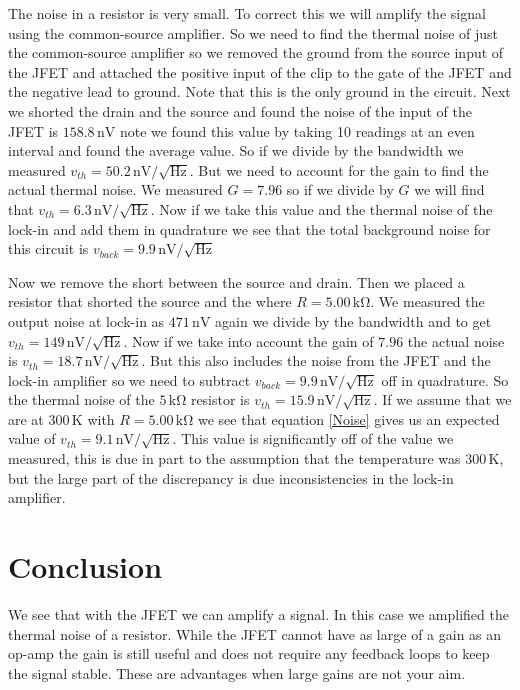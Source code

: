 \documentclass[11pt]{article}
\numberwithin{equation}{section}
\numberwithin{figure}{section}
\numberwithin{table}{section}
\newcommand{\unit}[1]{\ensuremath{\, \mathrm{#1}}}
\begin{document}
The noise in a resistor is very small. To correct this we will amplify the signal using the common-source amplifier. So we need to find the thermal noise of just the common-source amplifier so we removed the ground from the source input of the JFET and attached the positive input of the clip to the gate of the JFET and the negative lead to ground. Note that this is the only ground in the circuit. Next we shorted the drain and the source and found the noise of the input of the JFET is $158.8\unit{nV}$ note we found this value by taking 10 readings at an even interval and found the average value. So if we divide by the bandwidth we measured $v_{th} = 50.2\unit{nV/\sqrt{Hz}}$. 
But we need to account for the gain to find the actual thermal noise. We measured $G=7.96$ so if we divide by $G$ we will find that $v_{th} = 6.3\unit{nV/\sqrt{Hz}}$. Now if we take this value and the thermal noise of the lock-in and add them in quadrature we see that the total background noise for this circuit is $v_{back} = 9.9\unit{nV/\sqrt{Hz}}$

Now we remove the short between the source and drain. Then we placed a resistor that shorted the source and the where $R=5.00\unit{k\Omega}$. We measured the output noise at lock-in as $471\unit{nV}$ again we divide by the bandwidth and to get $v_{th} = 149\unit{nV/\sqrt{Hz}}$. Now if we take into account the gain of $7.96$ the actual noise is $v_{th} = 18.7\unit{nV/\sqrt{Hz}}$. But this also includes the noise from the JFET and the lock-in amplifier so we need to subtract $v_{back}=9.9\unit{nV/\sqrt{Hz}}$ off in quadrature. So the thermal noise of the $5\unit{k\Omega}$ resistor is $v_{th}=15.9\unit{nV/\sqrt{Hz}}$. If we assume that we are at $300\unit{K}$ with $R=5.00\unit{k\Omega}$ we see that equation \ref{Noise} gives us an expected value of $v_{th} = 9.1\unit{nV/\sqrt{Hz}}$. This value is significantly off of the value we measured, this is due in part to the assumption that the temperature was $300\unit{K}$, but the large part of the discrepancy is due inconsistencies in the lock-in amplifier.

\section{Conclusion}
We see that with the JFET we can amplify a signal. In this case we amplified the thermal noise of a resistor. While the JFET cannot have as large of a gain as an op-amp the gain is still useful and does not require any feedback loops to keep the signal stable. These are advantages when large gains are not your aim.
\end{document}
